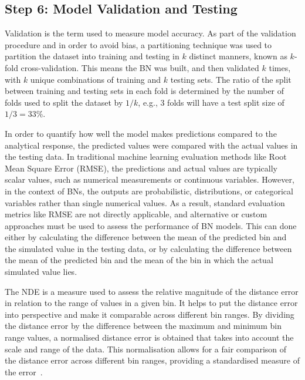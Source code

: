 \documentclass[journal]{IEEEtran}
\begin{document}
\subsection{\textbf{Step 6}: Model Validation and Testing}\label{sec:meth_validation} 

Validation is the term used to measure model accuracy. As part of the validation procedure and in order to avoid bias, a partitioning technique was used to partition the dataset into training and testing in $k$ distinct manners, known as $k$-fold cross-validation. This means the BN was built, and then validated $k$ times, with $k$ unique combinations of training and $k$ testing sets. The ratio of the split between training and testing sets in each fold is determined by the number of folds used to split the dataset by $1/k$, e.g., 3 folds will have a test split size of $1/3 = 33\%$. 

In order to quantify how well the model makes predictions compared to the analytical response, the predicted values were compared with the actual values in the testing data. In traditional machine learning evaluation methods like Root Mean Square Error (RMSE), the predictions and actual values are typically scalar values, such as numerical measurements or continuous variables. However, in the context of BNs, the outputs are probabilistic, distributions, or categorical variables rather than single numerical values. As a result, standard evaluation metrics like RMSE are not directly applicable, and alternative or custom approaches must be used to assess the performance of BN models. This can done either by calculating the difference between the mean of the predicted bin and the simulated value in the testing data, or by calculating the difference between the mean of the predicted bin and the mean of the bin in which the actual simulated value lies.

The NDE is a measure used to assess the relative magnitude of the distance error in relation to the range of values in a given bin. It helps to put the distance error into perspective and make it comparable across different bin ranges. By dividing the distance error by the difference between the maximum and minimum bin range values, a normalised distance error is obtained that takes into account the scale and range of the data. This normalisation allows for a fair comparison of the distance error across different bin ranges, providing a standardised measure of the error~\cite{Conti2019}.
\end{document}

